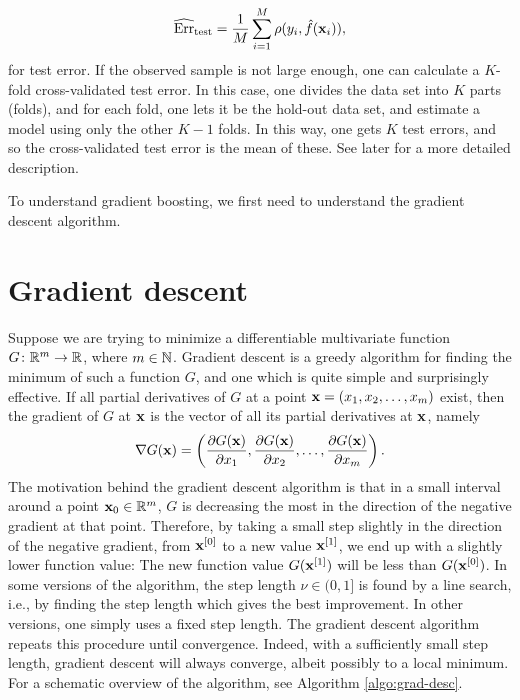 \begin{equation*}
    \widehat{\text{Err}}_{\text{test}}=\frac{1}{M}\sum_{i=1}^M \rho(y_i,\hat{f}(\mathbf{x}_i)),
\end{equation*}
for test error. If the observed sample is not large enough, one can calculate a $K$-fold cross-validated test error. In this case, one divides the data set into $K$ parts (folds), and for each fold, one lets it be the hold-out data set, and estimate a model using only the other $K-1$ folds. In this way, one gets $K$ test errors, and so the cross-validated test error is the mean of these. See later for a more detailed description.

To understand gradient boosting, we first need to understand the gradient descent algorithm.
\section{Gradient descent}
Suppose we are trying to minimize a differentiable multivariate function $G\colon\mathbb{R}^m\to\mathbb{R}$, where $m\in\mathbb{N}$. Gradient descent is a greedy algorithm for finding the minimum of such a function $G$, and one which is quite simple and surprisingly effective. If all partial derivatives of $G$ at a point $\mathbf{x}=(x_1,x_2,\ldots,x_m)$ exist, then the gradient of $G$ at $\mathbf{x}$ is the vector of all its partial derivatives at $\mathbf{x}$, namely
\begin{equation}
    \nabla G(\mathbf{x})=\left(\frac{\partial G(\mathbf{x})}{\partial x_1},\frac{\partial G(\mathbf{x})}{\partial x_2},\ldots,\frac{\partial G(\mathbf{x})}{\partial x_m}\right).
\end{equation}
The motivation behind the gradient descent algorithm is that in a small interval around a point $\mathbf{x}_0\in\mathbb{R}^m$, $G$ is decreasing the most in the direction of the negative gradient at that point. Therefore, by taking a small step slightly in the direction of the negative gradient, from $\mathbf{x}^{[0]}$ to a new value $\mathbf{x}^{[1]}$, we end up with a slightly lower function value: The new function value $G(\mathbf{x}^{[1]})$ will be less than $G(\mathbf{x}^{[0]})$. In some versions of the algorithm, the step length $\nu\in(0,1]$ is found by a line search, i.e., by finding the step length which gives the best improvement. In other versions, one simply uses a fixed step length. The gradient descent algorithm repeats this procedure until convergence. Indeed, with a sufficiently small step length, gradient descent will always converge, albeit possibly to a local minimum. For a schematic overview of the algorithm, see Algorithm \ref{algo:grad-desc}.

